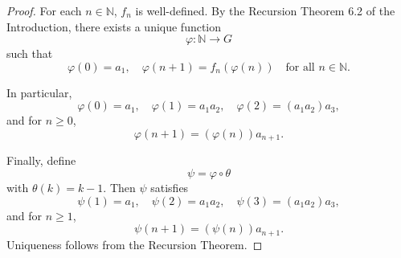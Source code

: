 \begin{proof}
For each $n \in \mathbb{N}$, $f_n$ is well-defined. By the Recursion Theorem 6.2 of the Introduction, there exists a unique function 
\[
\varphi : \mathbb{N} \to G
\] 
such that 
\[
\varphi(0) = a_1, \quad \varphi(n+1) = f_n(\varphi(n)) \quad \text{for all } n \in \mathbb{N}.
\]

In particular, 
\[
\varphi(0) = a_1, \quad \varphi(1) = a_1 a_2, \quad \varphi(2) = (a_1 a_2) a_3,
\] 
and for $n \ge 0$, 
\[
\varphi(n+1) = (\varphi(n)) a_{n+1}.
\]

Finally, define 
\[
\psi = \varphi \circ \theta
\] 
with $\theta(k) = k-1$. Then $\psi$ satisfies 
\[
\psi(1) = a_1, \quad \psi(2) = a_1 a_2, \quad \psi(3) = (a_1 a_2) a_3,
\] 
and for $n \ge 1$, 
\[
\psi(n+1) = (\psi(n)) a_{n+1}.
\] 
Uniqueness follows from the Recursion Theorem. 
\end{proof}
